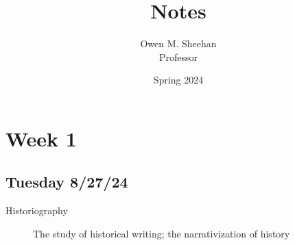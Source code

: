 \documentclass[12pt]{article}
\title{\class{} Notes}
\author{Owen M. Sheehan\\Professor \prof{}}
\date{Spring 2024}
\begin{document}
\maketitle
\tableofcontents
\newpage
    \section{Week 1}
        \subsection{Tuesday 8/27/24}
        \bigskip
            \begin{description}
                \item[Historiography] The study of historical writing; the narrativization of history
            \end{description}
        \bigskip
\end{document}
